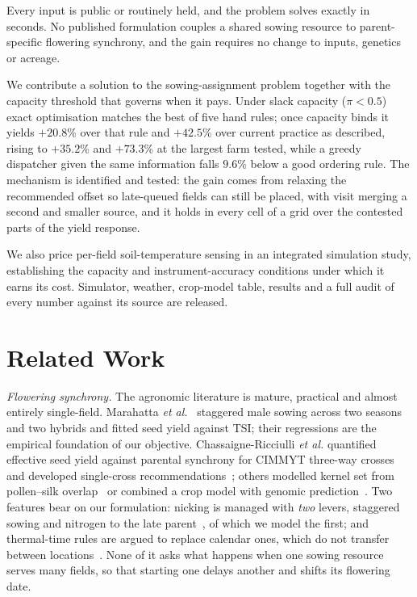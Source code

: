 \documentclass[10pt,twocolumn]{article}
\begin{document}
Every input is public or routinely held, and the problem solves exactly in
seconds. No published formulation couples a shared sowing resource to
parent-specific flowering synchrony, and the gain requires no change to
inputs, genetics or acreage.

We contribute a solution to the sowing-assignment problem together with the
capacity threshold that governs when it pays. Under slack capacity
($\pi < 0.5$) exact optimisation matches the best of five hand rules; once
capacity binds it yields $+20.8$\% over that rule and $+42.5$\% over current
practice as described, rising to $+35.2$\% and $+73.3$\% at the largest farm
tested, while a greedy dispatcher given the same information falls $9.6$\%
below a good ordering rule. The mechanism is identified and tested: the gain
comes from relaxing the recommended offset so late-queued fields can still
be placed, with visit merging a second and smaller source, and it holds in
every cell of a grid over the contested parts of the yield response.

We also price per-field soil-temperature sensing in an integrated simulation
study, establishing the capacity and instrument-accuracy conditions under
which it earns its cost. Simulator, weather, crop-model table, results and a
full audit of every number against its source are released.

\section{Related Work}
\label{sec:related}

\emph{Flowering synchrony.} The agronomic literature is mature, practical
and almost entirely single-field. Marahatta \textit{et
al.}~\cite{marahatta2025} staggered male sowing across two seasons and two
hybrids and fitted seed yield against TSI; their regressions are the
empirical foundation of our objective. Chassaigne-Ricciulli \textit{et al.}
quantified effective seed yield against parental synchrony for CIMMYT
three-way crosses~\cite{chassaigne2021} and developed single-cross
recommendations~\cite{chassaigne2020}; others modelled kernel set from
pollen--silk overlap~\cite{fonseca2004} or combined a crop model with
genomic prediction~\cite{laurent2025}. Two features bear on our formulation:
nicking is managed with \emph{two} levers, staggered sowing and nitrogen to
the late parent~\cite{priyanka2017,patil2026}, of which we model the first;
and thermal-time rules are argued to replace calendar ones, which do not
transfer between locations~\cite{asefa2024,varma2018}. None of it asks what
happens when one sowing resource serves many fields, so that starting one
delays another and shifts its flowering date.
\end{document}
